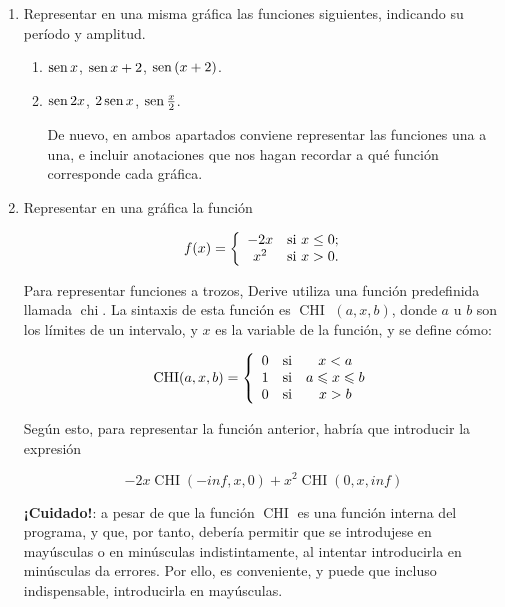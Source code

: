 \begin{enumerate}[leftmargin=*]
\begin{enumerate}
\begin{indicacion}
{}
\end{indicacion}

\end{enumerate}




\item Representar en una misma gráfica las funciones siguientes, indicando su período y amplitud.

\begin{enumerate}

\item $\mathop{\rm sen}\nolimits{x}$, $\mathop{\rm sen}\nolimits{x}+2$, $\mathop{\rm sen}\nolimits{(x+2)}$.

\item $\mathop{\rm sen}\nolimits{2x}$, $2\mathop{\rm sen}\nolimits{x}$, $\mathop{\rm sen}\nolimits\frac{x}{2}$.

\begin{indicacion}
{ De nuevo, en ambos apartados conviene representar las funciones
una a una, e incluir anotaciones que nos hagan recordar a qué
función corresponde cada gráfica.


}
\end{indicacion}

\end{enumerate}

\item Representar en una gráfica la función

\[
\ f(x)=\left\{%
\begin{array}{cl}
    -2x & \hbox{si $x\leq0$;} \\
    x^{2} & \hbox{si $x>0$.} \\
\end{array}%
\right.
\]

\begin{indicacion}
{Para representar funciones a trozos, Derive utiliza una función
predefinida llamada $\operatorname{chi}$. La sintaxis de esta
función es $\operatorname{CHI}$ $(a,x,b)$, donde $a$ u $b$ son los
límites de un intervalo, y $x$ es la variable de la función, y se
define cómo:


\[
\operatorname{CHI} (a,x,b) = \left\{ {\begin{array}{*{20}c}
   0 & {\text{si}} & {x < a}  \\
   1 & {\text{si}} & {a \leqslant x \leqslant b}  \\
   0 & {\text{si}} & {x > b}  \\

 \end{array} } \right.
\]


Según esto, para representar la función anterior, habría que
introducir la expresión

\[
-2x \operatorname{CHI}(-inf,x,0)+x^2\operatorname{CHI}(0,x,inf)
\]

\textbf{¡Cuidado!}: a pesar de que la función $\operatorname{CHI}$
es una función interna del programa, y que, por tanto, debería
permitir que se introdujese en mayúsculas o en minúsculas
indistintamente, al intentar introducirla en minúsculas da
errores. Por ello, es conveniente, y puede que incluso
indispensable, introducirla en mayúsculas. }
\end{indicacion}


\end{enumerate}
